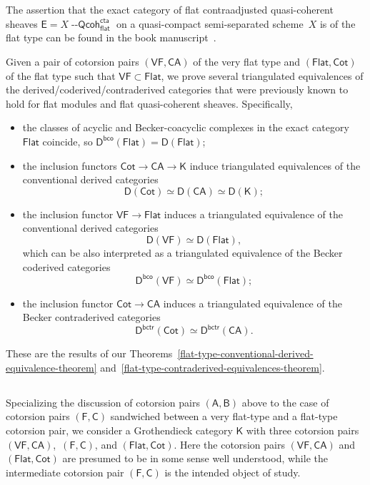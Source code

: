 \documentclass[12pt,a4paper]{amsart}
\newcommand{\+}{\nobreakdash-}
\renewcommand{\:}{\colon}
\newcommand{\rarrow}{\longrightarrow}
\newcommand{\Qcoh}{{\operatorname{\mathsf{--Qcoh}}}}
\newcommand{\sA}{\mathsf A}
\newcommand{\sB}{\mathsf B}
\newcommand{\sC}{\mathsf C}
\newcommand{\sD}{\mathsf D}
\newcommand{\sE}{\mathsf E}
\newcommand{\sF}{\mathsf F}
\newcommand{\sK}{\mathsf K}
\newcommand{\VF}{\mathsf{VF}}
\newcommand{\CA}{\mathsf{CA}}
\newcommand{\Flat}{\mathsf{Flat}}
\newcommand{\Cot}{\mathsf{Cot}}
\renewcommand{\flat}{\mathsf{flat}}
\newcommand{\cta}{\mathsf{cta}}
\newcommand{\bco}{\mathsf{bco}}
\newcommand{\bctr}{\mathsf{bctr}}
\theoremstyle{plain}
\theoremstyle{definition}
\begin{document}
 The assertion that the exact category of flat contraadjusted
quasi-coherent sheaves $\sE=X\Qcoh_\flat^\cta$ on a quasi-compact
semi-separated scheme~$X$ is of the flat type can be found in
the book manuscript~\cite[Corollary~5.5.11]{Pcosh}.

 Given a pair of cotorsion pairs $(\VF,\CA)$ of the very flat type
and $(\Flat,\Cot)$ of the flat type such that $\VF\subset\Flat$,
we prove several triangulated equivalences of
the derived/coderived/contraderived categories that were previously
known to hold for flat modules and flat quasi-coherent sheaves.
 Specifically,
\begin{itemize}
\item the classes of acyclic and Becker-coacyclic complexes in
the exact category $\Flat$ coincide, so $\sD^\bco(\Flat)=\sD(\Flat)$;
\item the inclusion functors $\Cot\rarrow\CA\rarrow\sK$ induce
triangulated equivalences of the conventional derived categories
$$
 \sD(\Cot)\simeq\sD(\CA)\simeq\sD(\sK);
$$
\item the inclusion functor $\VF\rarrow\Flat$ induces a triangulated
equivalence of the conventional derived categories
$$
 \sD(\VF)\simeq\sD(\Flat),
$$
which can be also interpreted as a triangulated equivalence of
the Becker coderived categories
$$
 \sD^\bco(\VF)\simeq\sD^\bco(\Flat);
$$
\item the inclusion functor $\Cot\rarrow\CA$ induces a triangulated
equivalence of the Becker contraderived categories
$$
 \sD^\bctr(\Cot)\simeq\sD^\bctr(\CA).
$$
\end{itemize}
 These are the results of our
Theorems~\ref{flat-type-conventional-derived-equivalence-theorem}
and~\ref{flat-type-contraderived-equivalences-theorem}.

\subsection{{}}
 Specializing the discussion of cotorsion pairs $(\sA,\sB)$ above to
the case of cotorsion pairs $(\sF,\sC)$ sandwiched between
a very flat-type and a flat-type cotorsion pair, we consider
a Grothendieck category $\sK$ with three cotorsion pairs $(\VF,\CA)$,
\,$(\sF,\sC)$, and $(\Flat,\Cot)$.
 Here the cotorsion pairs $(\VF,\CA)$ and $(\Flat,\Cot)$ are presumed
to be in some sense well understood, while the intermediate cotorsion
pair $(\sF,\sC)$ is the intended object of study.
\end{document}
